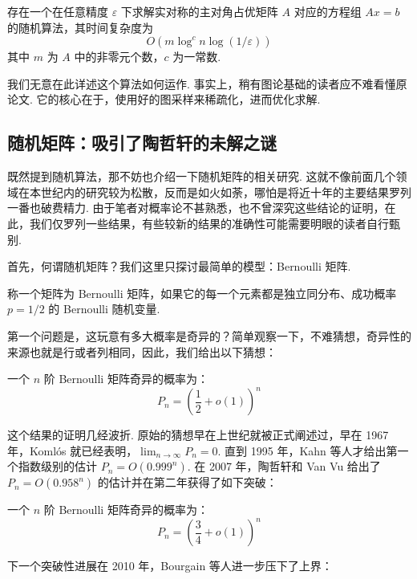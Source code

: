 \begin{theorem}
    存在一个在任意精度 $\varepsilon$ 下求解实对称的主对角占优矩阵 $A$ 对应的方程组 $Ax = b$ 的随机算法，其时间复杂度为
    \[ O(m \log^c n \log(1 / \varepsilon)) \]
    其中 $m$ 为 $A$ 中的非零元个数，$c$ 为一常数.
\end{theorem}

我们无意在此详述这个算法如何运作. 事实上，稍有图论基础的读者应不难看懂原论文. 它的核心在于，使用好的图采样来稀疏化，进而优化求解.

\subsection{随机矩阵：吸引了陶哲轩的未解之谜}

既然提到随机算法，那不妨也介绍一下随机矩阵的相关研究. 这就不像前面几个领域在本世纪内的研究较为松散，反而是如火如荼，哪怕是将近十年的主要结果罗列一番也破费精力. 由于笔者对概率论不甚熟悉，也不曾深究这些结论的证明，在此，我们仅罗列一些结果，有些较新的结果的准确性可能需要明眼的读者自行甄别.

首先，何谓随机矩阵？我们这里只探讨最简单的模型：Bernoulli 矩阵.

\begin{definition}
    称一个矩阵为 Bernoulli 矩阵，如果它的每一个元素都是独立同分布、成功概率 $p = 1/2$ 的 Bernoulli 随机变量.
\end{definition}

第一个问题是，这玩意有多大概率是奇异的？简单观察一下，不难猜想，奇异性的来源也就是行或者列相同，因此，我们给出以下猜想：

\begin{theorem}[Tikhomirov, 2020] \label{thm:16:tik2020}
    一个 $n$ 阶 Bernoulli 矩阵奇异的概率为：
    \[ P_n = \left( \frac{1}{2} + o(1) \right)^n \]
\end{theorem}

这个结果的证明几经波折. 原始的猜想早在上世纪就被正式阐述过，早在 1967 年，Koml\'os 就已经表明，$\displaystyle\lim_{n \to \infty} P_n = 0$. 直到 1995 年，Kahn 等人才给出第一个指数级别的估计 $P_n = O(0.999^n)$. 在 2007 年，陶哲轩和 Van Vu 给出了 $P_n = O(0.958^n)$ 的估计并在第二年获得了如下突破：

\begin{theorem}[Tao-Vu, 2007]
    一个 $n$ 阶 Bernoulli 矩阵奇异的概率为：
    \[ P_n = \left( \frac{3}{4} + o(1) \right)^n \]
\end{theorem}

下一个突破性进展在 2010 年，Bourgain 等人进一步压下了上界：

